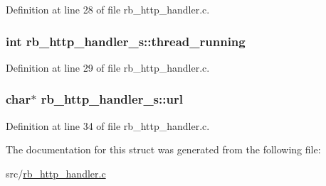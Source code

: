 Definition at line 28 of file rb\-\_\-http\-\_\-handler.\-c.

\hypertarget{structrb__http__handler__s_a978656c7c89a80d411121107c97a0dcd}{
\subsubsection[{thread\-\_\-running}]{\setlength{\rightskip}{0pt plus 5cm}int rb\-\_\-http\-\_\-handler\-\_\-s\-::thread\-\_\-running}}\label{structrb__http__handler__s_a978656c7c89a80d411121107c97a0dcd}


Definition at line 29 of file rb\-\_\-http\-\_\-handler.\-c.

\hypertarget{structrb__http__handler__s_a1f0df317f6eca7893bb08a54f13870ef}{
\subsubsection[{url}]{\setlength{\rightskip}{0pt plus 5cm}char$\ast$ rb\-\_\-http\-\_\-handler\-\_\-s\-::url}}\label{structrb__http__handler__s_a1f0df317f6eca7893bb08a54f13870ef}


Definition at line 34 of file rb\-\_\-http\-\_\-handler.\-c.



The documentation for this struct was generated from the following file\-:\begin{DoxyCompactItemize}
\item 
src/\hyperlink{rb__http__handler_8c}{rb\-\_\-http\-\_\-handler.\-c}\end{DoxyCompactItemize}
